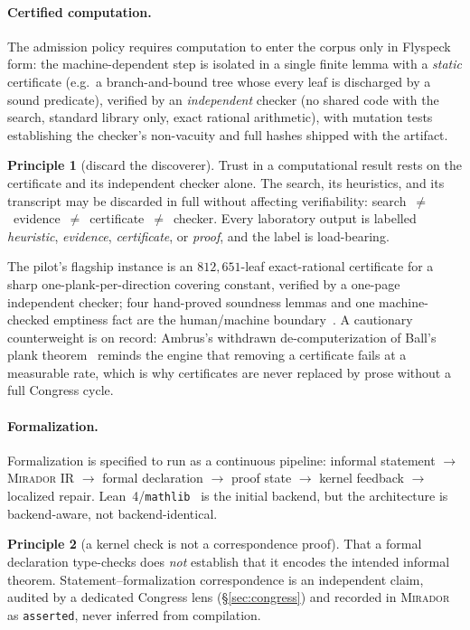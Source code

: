 \documentclass[11pt]{amsart}
\theoremstyle{definition}
\newtheorem{principle}{Principle}
\theoremstyle{remark}
\newcommand{\mirador}{\textsc{Mirador}}
\begin{document}
\paragraph{Certified computation.}
The admission policy requires computation to enter the corpus only in Flyspeck
form: the machine-dependent step
is isolated in a single finite lemma with a \emph{static} certificate (e.g.\ a
branch-and-bound tree whose every leaf is discharged by a sound predicate),
verified by an \emph{independent} checker (no shared code with the search,
standard library only, exact rational arithmetic), with mutation tests
establishing the checker's non-vacuity and full hashes shipped with the artifact.
\begin{principle}[discard the discoverer]\label{pr:discard}
Trust in a computational result rests on the certificate and its independent
checker alone. The search, its heuristics, and its transcript may be discarded
in full without affecting verifiability:
search~$\neq$~evidence~$\neq$~certificate~$\neq$~checker. Every laboratory
output is labelled \emph{heuristic}, \emph{evidence}, \emph{certificate}, or
\emph{proof}, and the label is load-bearing.
\end{principle}
The pilot's flagship instance is an $812{,}651$-leaf exact-rational certificate
for a sharp one-plank-per-direction covering constant, verified by a one-page
independent checker; four hand-proved soundness lemmas and one machine-checked
emptiness fact are the human/machine boundary~\cite{Lucius26}. A cautionary
counterweight is on record: Ambrus's withdrawn de-computerization of Ball's plank
theorem~\cite{Ambrus22} reminds the engine that removing a certificate fails at
a measurable rate, which is why certificates are never replaced by prose without
a full Congress cycle.

\paragraph{Formalization.}
Formalization is specified to run as a continuous pipeline: informal statement $\to$ \mirador{}
IR $\to$ formal declaration $\to$ proof state $\to$ kernel feedback $\to$
localized repair. Lean~4/\texttt{mathlib}~\cite{mathlib20} is the initial
backend, but the architecture is backend-aware, not backend-identical.
\begin{principle}[a kernel check is not a correspondence proof]\label{pr:correspond}
That a formal declaration type-checks does \emph{not} establish that it encodes
the intended informal theorem. Statement--formalization correspondence is an
independent claim, audited by a dedicated Congress lens (\S\ref{sec:congress})
and recorded in \mirador{} as \texttt{asserted}, never inferred from
compilation.
\end{principle}
\end{document}
